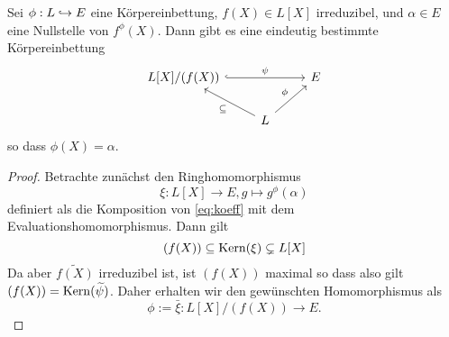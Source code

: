 \documentclass{book}
\begin{document}
\begin{lem}
    \label{lem:primitive}
    Sei $\phi: L \hra E$ eine Körpereinbettung, $f(X) \in L[X]$ irreduzibel,
    und $\alpha \in E$ eine Nullstelle von $f^{\phi}(X)$. Dann gibt es eine
    eindeutig bestimmte Körpereinbettung
        \[
        \begin{tikzcd}
            L[X]/(f(X)) \ar[hook]{rr}{\psi} & &E\\
                                                 & L\ar{ul}{\subset} \ar{ur}{\phi} & 
        \end{tikzcd}
        \]
        so dass $\phi(X) = \alpha$. 
\end{lem}
\begin{proof}
    Betrachte zunächst den Ringhomomorphismus
    \[
       {\xi}: L[X] \to E, g \mapsto g^\phi(\alpha)
    \]
    definiert als die Komposition von \eqref{eq:koeff} mit dem
    Evaluationshomomorphismus. Dann gilt 
    \[
        (f(X)) \subseteq \operatorname{Kern}(\xi) \subsetneq L[X]
    \]
    Da aber $\widetilde{f(X)}$ irreduzibel ist, ist $(f(X))$ maximal so dass
    also gilt $(f(X)) =  \operatorname{Kern}(\widetilde{\psi})$. Daher erhalten wir den
    gewünschten Homomorphismus als
    \[
        \phi := \bar{\xi}: L[X]/(f(X)) \to E.
    \]
\end{proof}
\end{document}
